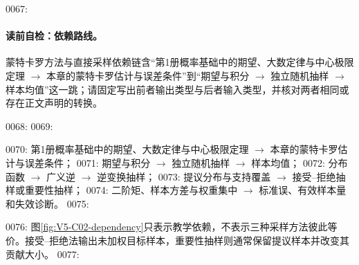 0067: \paragraph{读前自检：依赖路线。}蒙特卡罗方法与直接采样依赖链含“第1册概率基础中的期望、大数定律与中心极限定理 $\to$ 本章的蒙特卡罗估计与误差条件”到“期望与积分 $\to$ 独立随机抽样 $\to$ 样本均值”这一跳；请固定写出前者输出类型与后者输入类型，并核对两者相同或存在正文声明的转换。\par
0068: 
0069: \begin{dependencybox}
0070: 第1册概率基础中的期望、大数定律与中心极限定理 $\to$ 本章的蒙特卡罗估计与误差条件；
0071: 期望与积分 $\to$ 独立随机抽样 $\to$ 样本均值；
0072: 分布函数 $\to$ 广义逆 $\to$ 逆变换抽样；
0073: 提议分布与支持覆盖 $\to$ 接受--拒绝抽样或重要性抽样；
0074: 二阶矩、样本方差与权重集中 $\to$ 标准误、有效样本量和失效诊断。
0075: \end{dependencybox}
0076: 图\ref{fig:V5-C02-dependency}只表示教学依赖，不表示三种采样方法彼此等价。接受--拒绝法输出未加权目标样本，重要性抽样则通常保留提议样本并改变其贡献大小。
0077: 

